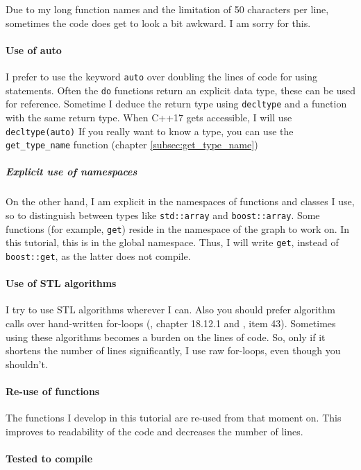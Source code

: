 Due to my long function names and the limitation of 50 characters per line,
sometimes the code does get to look a bit awkward.
I am sorry for this.

\paragraph{Use of auto}

I prefer to use the keyword \verb;auto; 
over doubling the lines of code for using
statements.
Often the \verb;do; functions return an explicit data type, 
these can be used for reference.
Sometime I deduce the return type using \verb;decltype; 
and a function with the same return type.
When C++17  gets accessible, 
I will use \verb;decltype(auto); 
If you really want to know a type, 
you can use the \verb;get_type_name; function (chapter \ref{subsec:get_type_name})

\subparagraph{Explicit use of namespaces}

On the other hand, I am explicit in the namespaces of functions and classes
I use, so to distinguish between types 
like \verb;std::array; and \verb;boost::array;.
Some functions (for example, \verb;get;) reside 
in the namespace of the graph to work on.
In this tutorial, this is in the global namespace.
Thus, I will write \verb;get;, instead of \verb;boost::get;, 
as the latter does not compile.

\paragraph{Use of STL algorithms}

I try to use STL algorithms wherever I can.
Also you should prefer algorithm calls over hand-written 
for-loops (\cite{stroustrup1997}, chapter 18.12.1 and \cite{meyers2005effective}, item 43).
Sometimes using these algorithms becomes a burden on the lines of code.
So, only if it shortens the number of lines significantly, I use raw for-loops,
even though you shouldn't.

\paragraph{Re-use of functions}

The functions I develop in this tutorial are re-used from that moment on.
This improves to readability of the code and decreases the number of lines.

\paragraph{Tested to compile}

